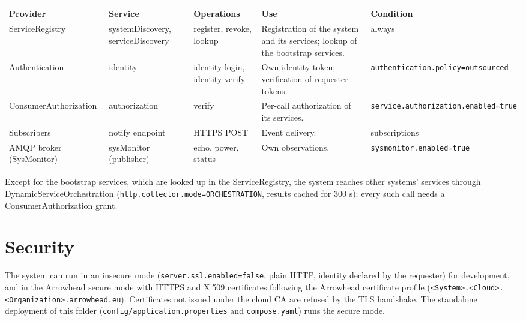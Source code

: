 \documentclass[a4paper]{arrowhead}
\begin{document}
\noindent\begin{longtable}{| >{\raggedright\arraybackslash}p{2.9cm} | >{\raggedright\arraybackslash}p{3.1cm} | >{\raggedright\arraybackslash}p{2.5cm} | p{3.6cm} | >{\raggedright\arraybackslash}p{2.9cm} |} \hline
\rowcolor{gray!33} Provider & Service & Operations & Use & Condition \\ \hline \endhead
ServiceRegistry & systemDiscovery, serviceDiscovery & register, revoke, lookup & Registration of the system and its services; lookup of the bootstrap services. & always \\ \hline
Authentication & identity & identity-login, identity-verify & Own identity token; verification of requester tokens. & \texttt{authentication.\allowbreak{}policy=\allowbreak{}outsourced} \\ \hline
Consumer\allowbreak{}Authorization & authorization & verify & Per-call authorization of its services. & \texttt{service.\allowbreak{}authorization.\allowbreak{}enabled=\allowbreak{}true} \\ \hline
Subscribers & notify endpoint & HTTPS POST & Event delivery. & subscriptions \\ \hline
AMQP broker (SysMonitor) & sysMonitor (publisher) & echo, power, status & Own observations. & \texttt{sysmonitor.\allowbreak{}enabled=\allowbreak{}true} \\ \hline
\end{longtable}

Except for the bootstrap services, which are looked up in the ServiceRegistry, the system reaches other systems' services through DynamicServiceOrchestration (\texttt{http.collector.mode=ORCHESTRATION}, results cached for 300 s); every such call needs a ConsumerAuthorization grant.

\newpage

\section{Security}
\label{sec:security}

The system can run in an insecure mode (\texttt{server.ssl.enabled=false}, plain HTTP, identity declared by the requester) for development, and in the Arrowhead secure mode with HTTPS and X.509 certificates following the Arrowhead certificate profile (\texttt{<System>.<Cloud>.<Organization>.arrowhead.eu}). Certificates not issued under the cloud CA are refused by the TLS handshake. The standalone deployment of this folder (\texttt{config/\allowbreak{}application.\allowbreak{}properties} and \texttt{compose.yaml}) runs the secure mode.
\end{document}
